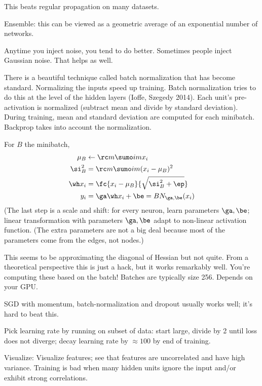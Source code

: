 This beats regular propagation on many datasets.

Ensemble: this can be viewed as a geometric average of an exponential number of networks. 


Anytime you inject noise, you tend to do better. Sometimes people inject Gaussian noise. That helps as well. %

There is a beautiful technique called batch normalization that has become standard. Normalizing the inputs speed up training. Batch normalization tries to do this at the level of the hidden layers (Ioffe, Szegedy 2014). Each unit's pre-activation is normalized (subtract mean and divide by standard deviation).  During training, mean and standard deviation are computed for each minibatch. Backprop takes into account the normalization.
\begin{alg}
For $B$ the minibatch,
\begin{align}
\mu_B &\leftarrow \rc m\sumo im x_i\\
\si_B^2 &= \rc m \sumo im (x_i - \mu_B)^2\\
\wh x_i &=\fc{x_i-\mu_B}{\sqrt{\si_B^2 + \ep}}\\
y_i & =\ga \wh x_i + \be = BN_{\ga, \be}(x_i)
\end{align}
(The last step is a scale and shift: for every neuron, learn parameters $\ga,\be$; linear transformation with parameters $\ga, \be$ adapt to non-linear activation function. %
(The extra parameters are not  a big deal because most of the parameters come from the edges, not nodes.)
\end{alg}
This seems to be approximating the diagonal of Hessian but not quite. From a theoretical perspective this is just a hack, but it works remarkably well. You're computing these based on the batch! Batches are typically size 256. Depends on your GPU.

SGD with momentum, batch-normalization and dropout usually works well; it's hard to beat this.

Pick learning rate by running on subset of data: start large, divide by 2 until loss does not diverge; decay learning rate by $\approx 100$ by end of training.

Visualize: %
Visualize features; see that features are uncorrelated and have high variance. 
Training is bad when many hidden units ignore the input and/or exhibit strong correlations.

